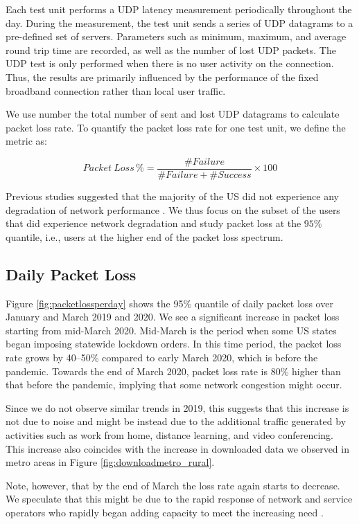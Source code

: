 Each test unit performs a UDP latency measurement periodically throughout the day. During the measurement, the test unit sends a series of UDP datagrams to a pre-defined set of servers. Parameters such as minimum, maximum, and average round  trip time are recorded, as well as the number of lost UDP packets. The UDP test is only performed when there is no user activity on the connection. Thus, the results are primarily influenced by the performance of the fixed broadband connection rather than local user traffic.

We use number the total number of sent and lost UDP datagrams to calculate packet loss rate. To quantify the packet loss rate for one test unit, we define the metric as:

\begin{equation}
    Packet \ Loss\, \% = \frac{\#Failure }{\#Failure + \#Success} \times 100
\end{equation}

Previous studies suggested that the majority of the US did not experience any degradation of network performance \cite{kovacs}. We thus focus on the subset of the users that did experience network degradation and study packet loss at the $95\%$ quantile, i.e., users at the higher end of the packet loss spectrum.

\subsection{Daily Packet Loss}

Figure \ref{fig:packetlossperday} shows the 95\% quantile of daily packet loss over January and March 2019 and 2020. We see a significant increase in packet loss starting from mid-March 2020. Mid-March is the period when some US states began imposing statewide lockdown orders. In this time period, the packet loss rate grows by 40--50\% compared to early March 2020, which is before the pandemic. Towards the end of March 2020, packet loss rate is 80\% higher than that before the pandemic, implying that some network congestion might occur.

Since we do not observe similar trends in 2019, this suggests that this increase is not due to noise and might be instead due to the additional traffic generated by activities such as work from home, distance learning, and video conferencing. This increase also coincides with the increase in downloaded data we observed in metro areas in Figure \ref{fig:downloadmetro_rural}.

Note, however, that by the end of March the loss rate again starts to decrease. We speculate that this might be due to the rapid response of network and service operators who rapidly began adding capacity to meet the increasing need \cite{liu2020characterizing}.

